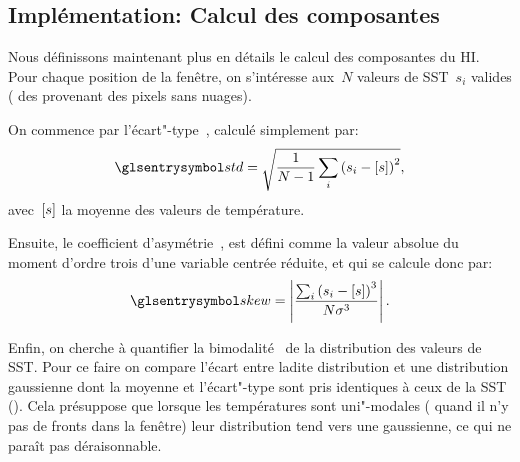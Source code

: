 \subsection{Implémentation: Calcul des composantes}
\label{sec:calcul-composantes}

Nous définissons maintenant plus en détails le calcul des composantes du HI.
Pour chaque position de la fenêtre, on s'intéresse aux~\(N\) valeurs de SST~\(s_{i}\) valides ( des provenant des pixels sans nuages).

On commence par l'écart"-type~, calculé simplement par:
\begin{equation}
  \am{std} = \sqrt{\frac{1}{N-1} \sum_i \paren{s_i - \moy{s}}^2},
\end{equation}
avec~\(\left[s\right]\) la moyenne des valeurs de température.

Ensuite, le coefficient d'asymétrie~, est défini comme la valeur absolue du moment d'ordre trois d'une variable centrée réduite, et qui se calcule donc par:
\begin{equation}
  \am{skew} = \abs{\frac{\sum_i \paren{s_i - \moy{s}}^3} {N \sigma^3}}.
\end{equation}

Enfin, on cherche à quantifier la bimodalité~ de la distribution des valeurs de SST.
Pour ce faire on compare l'écart entre ladite distribution et une distribution gaussienne dont la moyenne et l'écart"-type sont pris identiques à ceux de la SST ().
Cela présuppose que lorsque les températures sont uni"-modales ( quand il n'y pas de fronts dans la fenêtre) leur distribution tend vers une gaussienne, ce qui ne paraît pas déraisonnable.

\begin{figure}
  \centering
  \label{fig:bimodality}
\end{figure}

